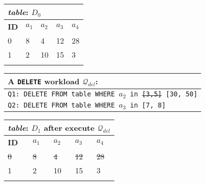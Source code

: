 

\begin{figure*}[ht]
	{\scriptsize
    \begin{minipage}[t]{0.2\textwidth}
         \vspace{0pt} 
         \centering
        \begin{tabular}{lllll}
            \multicolumn{5}{l}{\emph{table}: $D_0$}\\
            \toprule
            \textbf{ID}  & \textbf{$a_1$}    & \textbf{$a_2$} & \textbf{$a_3$} & \textbf{$a_4$} \\
            \midrule
            0 & 8 & 4 & 12 & 28\\
            1 & 2 & 10 & 15 & 3\\
            \bottomrule
            \\
    \end{tabular}
    \end{minipage}
     \begin{minipage}[t]{0.5\textwidth}
         \vspace{0pt} 
         \centering
        \begin{tabular}{l}
            \multicolumn{1}{l}{A \texttt{DELETE} workload  $\mathcal{Q}_{del}$:                                                            }\\
             \toprule
            \texttt{Q1: DELETE FROM table WHERE $a_2$ in \sout{[3,5]} {\color{red}[30, 50]}} \\
   			\texttt{Q2: DELETE FROM table WHERE $a_3$ in [7, 8] }\\ \hline
    \end{tabular}
    \end{minipage}
    \begin{minipage}[t]{0.2\textwidth}
         \vspace{0pt} 
         \centering
       \begin{tabular}{lllll}
            \multicolumn{5}{l}{\emph{table}: $D_1$ after execute $\mathcal{Q}_{del}$}\\
            \toprule
            \textbf{ID}  & \textbf{$a_1$}    & \textbf{$a_2$} & \textbf{$a_3$} & \textbf{$a_4$} \\
            \midrule
            \rowcolor{mid-gray}
            \sout{0} & \sout{8} & \sout{4} & \sout{12} & \sout{28}\\
            1 & 2 & 10 & 15 & 3\\
            \bottomrule
            \\
\end{tabular}
    \end{minipage} \\
  \begin{minipage}[t]{0.2\textwidth}
         \vspace{0pt} 
         \centering
        \begin{tabular}{lllll}
        

\end{tabular}
\end{minipage}}
\end{figure*}
